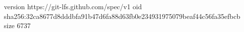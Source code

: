 version https://git-lfs.github.com/spec/v1
oid sha256:32ca8677d8dddbfa91b47d6fa88d63fb0e234931975079beaf44c56fa35efbcb
size 6737
